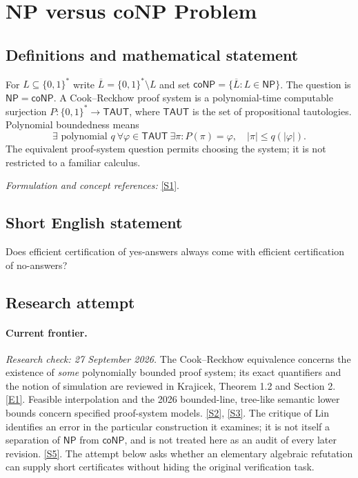 \documentclass[11pt,a4paper]{article}
\newcommand{\sref}[2]{\hyperlink{source:#1:#2}{[S#2]}}
\newcommand{\eref}[2]{\hyperlink{extra:#1:#2}{[E#2]}}
\newif\ifshowcatalogue
\newcommand{\cataloguescope}[1]{\ifshowcatalogue
 \paragraph{Exact scope in the supplied catalogue.}
 \begin{quote}\small #1\end{quote}\fi}
\begin{document}
\setcounter{section}{0}
\clearpage
\section*{\texorpdfstring{NP versus coNP Problem}{NP versus coNP Problem}}\label{statement}
\subsection{Definitions and mathematical statement}
For $L\subseteq\{0,1\}^*$ write $\overline L=\{0,1\}^*\setminus L$ and set $\mathsf{coNP}=\{\overline L:L\in\mathsf{NP}\}$. The question is $\mathsf{NP}=\mathsf{coNP}$. A Cook--Reckhow proof system is a polynomial-time computable surjection $P:\{0,1\}^*\to\mathsf{TAUT}$, where $\mathsf{TAUT}$ is the set of propositional tautologies. Polynomial boundedness means
\[
 \exists\text{ polynomial }q\ \forall\varphi\in\mathsf{TAUT}\ \exists\pi:
 P(\pi)=\varphi,\quad|\pi|\le q(|\varphi|).
\]
The equivalent proof-system question permits choosing the system; it is not restricted to a familiar calculus.
\par\smallskip\textit{Formulation and concept references:} \sref{statement}{1}.
\cataloguescope{Determine whether NP = coNP, that is, whether the class NP is closed under complementation. Equivalently, by the Cook-Reckhow criterion, decide whether there exists a polynomially bounded propositional proof system.}
\subsection{Short English statement}
Does efficient certification of yes-answers always come with efficient certification of no-answers?
\subsection{Research attempt}
\paragraph{Current frontier.}
\textit{Research check: 27 September 2026.}
The Cook--Reckhow equivalence concerns the existence of \emph{some}
polynomially bounded proof system; its exact quantifiers and the notion
of simulation are reviewed in Krajicek, Theorem 1.2 and Section 2.
\eref{statement}{1}. Feasible interpolation and the 2026 bounded-line,
tree-like semantic lower bounds concern specified proof-system models.
\sref{statement}{2}, \sref{statement}{3}. The critique of Lin identifies an error in
the particular construction it examines; it is not itself a separation
of $\mathsf{NP}$ from $\mathsf{coNP}$, and is not treated here as an
audit of every later revision. \sref{statement}{5}.
The attempt below asks whether an elementary algebraic refutation can
supply short certificates without hiding the original verification task.
\end{document}
